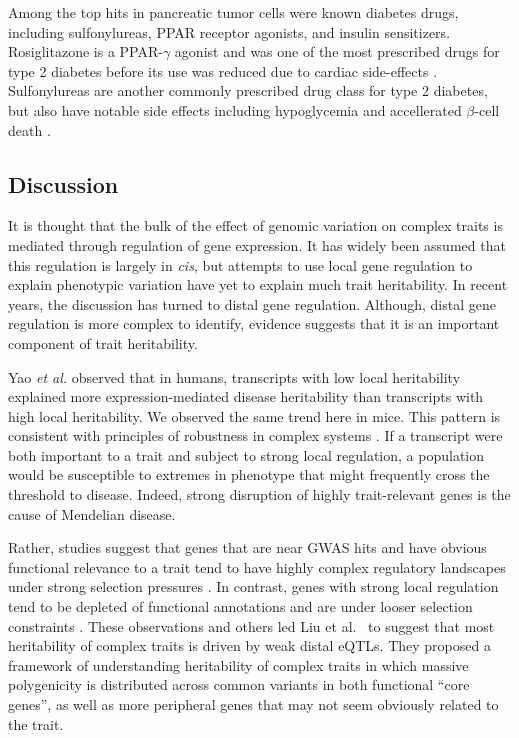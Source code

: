 \documentclass[
]{article}
\begin{document}
Among the top hits in pancreatic tumor cells were known diabetes drugs,
including sulfonylureas, PPAR receptor agonists, and insulin
sensitizers. Rosiglitazone is a PPAR-\(\gamma\) agonist and was one of
the most prescribed drugs for type 2 diabetes before its use was reduced
due to cardiac side-effects \cite{pmid21190462}. Sulfonylureas are
another commonly prescribed drug class for type 2 diabetes, but also
have notable side effects including hypoglycemia and accellerated
\(\beta\)-cell death \cite{pmid16631807}.

\subsection{Discussion}\label{discussion}

It is thought that the bulk of the effect of genomic variation on
complex traits is mediated through regulation of gene expression. It has
widely been assumed that this regulation is largely in \textit{cis}, but
attempts to use local gene regulation to explain phenotypic variation
have yet to explain much trait heritability. In recent years, the
discussion has turned to distal gene regulation. Although, distal gene
regulation is more complex to identify, evidence suggests that it is an
important component of trait heritability.

Yao \textit{et al.} \cite{pmid32424349} observed that in humans,
transcripts with low local heritability explained more
expression-mediated disease heritability than transcripts with high
local heritability. We observed the same trend here in mice. This
pattern is consistent with principles of robustness in complex systems
\cite{pmid29782925, pmid12082173, pmid27304973}. If a transcript were
both important to a trait and subject to strong local regulation, a
population would be susceptible to extremes in phenotype that might
frequently cross the threshold to disease. Indeed, strong disruption of
highly trait-relevant genes is the cause of Mendelian disease.

Rather, studies suggest that genes that are near GWAS hits and have
obvious functional relevance to a trait tend to have highly complex
regulatory landscapes under strong selection pressures
\cite{pmid37857933}. In contrast, genes with strong local regulation
tend to be depleted of functional annotations and are under looser
selection constraints \cite{pmid37857933}. These observations and others
led Liu et al.~\cite{pmid31051098} to suggest that most heritability of
complex traits is driven by weak distal eQTLs. They proposed a framework
of understanding heritability of complex traits in which massive
polygenicity is distributed across common variants in both functional
``core genes'', as well as more peripheral genes that may not seem
obviously related to the trait.
\end{document}
